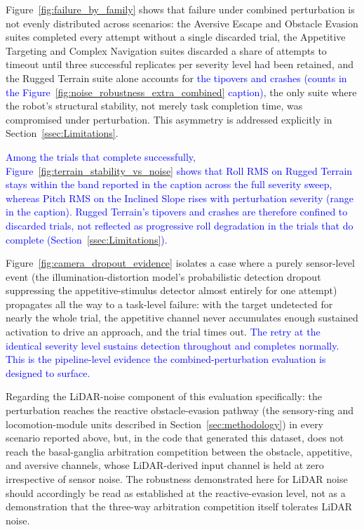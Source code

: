 \documentclass[preprint,12pt]{elsarticle}
\newcommand{\revblue}[1]{\textcolor{blue}{#1}}
\begin{document}
Figure~\ref{fig:failure_by_family} shows that failure under combined perturbation is not evenly distributed across scenarios: the Aversive Escape and Obstacle Evasion suites completed every attempt without a single discarded trial, the Appetitive Targeting and Complex Navigation suites discarded a share of attempts to timeout until three successful replicates per severity level had been retained, and the Rugged Terrain suite alone accounts for \revblue{the tipovers and crashes (counts in the Figure~\ref{fig:noise_robustness_extra_combined} caption)}, the only suite where the robot's structural stability, not merely task completion time, was compromised under perturbation. This asymmetry is addressed explicitly in Section~\ref{ssec:Limitations}.

\revblue{Among the trials that complete successfully, Figure~\ref{fig:terrain_stability_vs_noise} shows that Roll RMS on Rugged Terrain stays within the band reported in the caption across the full severity sweep, whereas Pitch RMS on the Inclined Slope rises with perturbation severity (range in the caption). Rugged Terrain's tipovers and crashes are therefore confined to discarded trials, not reflected as progressive roll degradation in the trials that do complete (Section~\ref{ssec:Limitations}).}

Figure~\ref{fig:camera_dropout_evidence} isolates a case where a purely sensor-level event (the illumination-distortion model's probabilistic detection dropout suppressing the appetitive-stimulus detector almost entirely for one attempt) propagates all the way to a task-level failure: with the target undetected for nearly the whole trial, the appetitive channel never accumulates enough sustained activation to drive an approach, and the trial times out. \revblue{The retry at the identical severity level sustains detection throughout and completes normally. This is the pipeline-level evidence the combined-perturbation evaluation is designed to surface.}

Regarding the LiDAR-noise component of this evaluation specifically: the perturbation reaches the reactive obstacle-evasion pathway (the sensory-ring and locomotion-module units described in Section~\ref{sec:methodology}) in every scenario reported above, but, in the code that generated this dataset, does not reach the basal-ganglia arbitration competition between the obstacle, appetitive, and aversive channels, whose LiDAR-derived input channel is held at zero irrespective of sensor noise. The robustness demonstrated here for LiDAR noise should accordingly be read as established at the reactive-evasion level, not as a demonstration that the three-way arbitration competition itself tolerates LiDAR noise.
\end{document}

